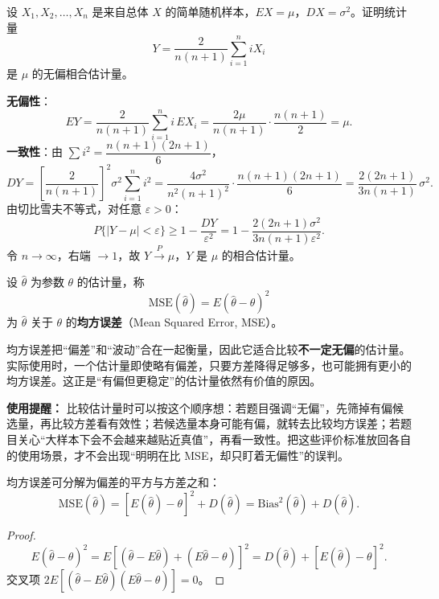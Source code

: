 ﻿\documentclass[lang=cn,11pt]{elegantbook}
\begin{document}
\begin{exercise}\label{exer:7-consistent}
设 \(X_1, X_2, \dots, X_n\) 是来自总体 \(X\) 的简单随机样本，\(EX = \mu\)，\(DX = \sigma^2\)。证明统计量
\[
Y = \frac{2}{n(n+1)}\sum_{i=1}^{n}iX_i
\]
是 \(\mu\) 的无偏相合估计量。
\end{exercise}
\begin{solution}
\textbf{无偏性}：
\[
EY = \frac{2}{n(n+1)}\sum_{i=1}^{n}i\,EX_i = \frac{2\mu}{n(n+1)}\cdot\frac{n(n+1)}{2} = \mu.
\]
\textbf{一致性}：由 \(\sum i^2 = \dfrac{n(n+1)(2n+1)}{6}\)，
\[
DY = \left[\frac{2}{n(n+1)}\right]^{\!2}\sigma^2\sum_{i=1}^{n}i^2 = \frac{4\sigma^2}{n^2(n+1)^2}\cdot\frac{n(n+1)(2n+1)}{6} = \frac{2(2n+1)}{3n(n+1)}\,\sigma^2.
\]
由切比雪夫不等式，对任意 \(\varepsilon > 0\)：
\[
P\{|Y-\mu| < \varepsilon\} \geq 1 - \frac{DY}{\varepsilon^2} = 1 - \frac{2(2n+1)\sigma^2}{3n(n+1)\varepsilon^2}.
\]
令 \(n\to\infty\)，右端 \(\to 1\)，故 \(Y\xrightarrow{P}\mu\)，\(Y\) 是 \(\mu\) 的相合估计量。
\end{solution}



\begin{definition}[均方误差] \label{def:mse}
设 \(\hat{\theta}\) 为参数 \(\theta\) 的估计量，称
\[
\mathrm{MSE}(\hat{\theta}) = E(\hat{\theta} - \theta)^2
\]
为 \(\hat{\theta}\) 关于 \(\theta\) 的\textbf{均方误差}（Mean Squared Error, MSE）。
\end{definition}

\begin{note}
均方误差把“偏差”和“波动”合在一起衡量，因此它适合比较\textbf{不一定无偏}的估计量。实际使用时，一个估计量即使略有偏差，只要方差降得足够多，也可能拥有更小的均方误差。这正是“有偏但更稳定”的估计量依然有价值的原因。
\end{note}

\begin{note}
\textbf{使用提醒：} 比较估计量时可以按这个顺序想：若题目强调“无偏”，先筛掉有偏候选量，再比较方差看有效性；若候选量本身可能有偏，就转去比较均方误差；若题目关心“大样本下会不会越来越贴近真值”，再看一致性。把这些评价标准放回各自的使用场景，才不会出现“明明在比 MSE，却只盯着无偏性”的误判。
\end{note}

\begin{property}[均方误差的分解] \label{prop:mse-decomp}
均方误差可分解为偏差的平方与方差之和：
\[
\mathrm{MSE}(\hat{\theta}) = [E(\hat{\theta}) - \theta]^2 + D(\hat{\theta}) = \mathrm{Bias}^2(\hat{\theta}) + D(\hat{\theta}).
\]
\begin{proof}
\[
E(\hat{\theta}-\theta)^2 = E\!\left[(\hat{\theta}-E\hat{\theta})+(E\hat{\theta}-\theta)\right]^2 = D(\hat{\theta}) + [E(\hat{\theta})-\theta]^2.
\]
交叉项 \(2E[(\hat{\theta}-E\hat{\theta})(E\hat{\theta}-\theta)] = 0\)。
\end{proof}
\end{property}
\end{document}
